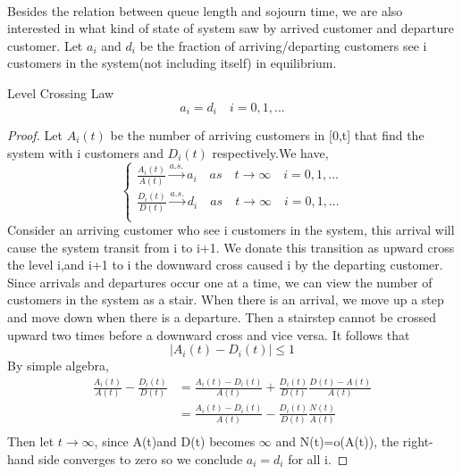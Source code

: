 \documentclass[project2.tex]{subfiles}
\begin{document}
\paragraph{} 
Besides the relation between queue length and sojourn time, we are also interested in what kind of state of system saw by arrived customer and departure customer. Let 
$a_i$ and $d_i$ be the fraction of arriving/departing customers see i customers in the system(not including itself) in equilibrium.  
\begin{property}
Level Crossing Law
$$a_i=d_i \quad i=0,1,...$$
\end{property}
\begin{proof}
Let $A_i(t)$ be the number of arriving customers in [0,t] that find the system with i customers and $D_i(t)$ respectively.We have,
\begin{equation*}
\left\{
\begin{array}{lcl}
\frac{A_i(t)}{A(t)}\overset{a.s.}{\rightarrow}a_i\quad as\quad t\rightarrow\infty \quad i=0,1,...  \\
\frac{D_i(t)}{D(t)}\overset{a.s.}{\rightarrow}d_i\quad as\quad t\rightarrow\infty \quad i=0,1,...  \\
\end{array} 
\right.
\end{equation*}
Consider an arriving customer who see i customers in the system, this arrival will cause the system transit from i to i+1. We donate this transition as upward cross the level i,and i+1 to i the downward cross caused i by the departing customer. Since arrivals and departures occur one at a time, we can view the number of customers in the system as a stair. When there is an arrival, we move up a step and move down when there is a departure. Then a stairstep cannot be crossed upward two times before a downward cross and vice versa. It follows that
$$|A_i(t)-D_i(t)|\leq 1$$ By simple algebra,
\begin{align*}
\frac{A_i(t)}{A(t)}-\frac{D_i(t)}{D(t)}&=\frac{A_i(t)-D_i(t)}{A(t)}+\frac{D_i(t)}{D(t)}\frac{D(t)-A(t)}{A(t)}\\
&=\frac{A_i(t)-D_i(t)}{A(t)}-\frac{D_i(t)}{D(t)}\frac{N(t)}{A(t)}\\
\end{align*}
Then let $t\rightarrow\infty$, since A(t)and D(t) becomes $\infty$ and N(t)=o(A(t)), the right-hand side converges to zero so we conclude $a_i=d_i$ for all i. 
\end{proof}
\end{document}
